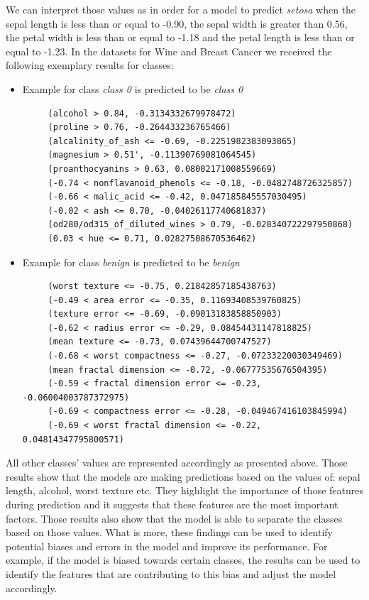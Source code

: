 \documentclass[journal, a4paper]{IEEEtran}
\begin{document}
We can interpret those values as in order for a model to predict \textit{setosa} when the sepal length is less than or equal to -0.90, the sepal width is greater than 0.56, the petal width is less than or equal to -1.18  and the petal length is less than or equal to -1.23.
In the datasets for Wine and Breast Cancer we received the following exemplary results for classes:

\begin{itemize}
    \item Example for class \textit{class 0} is predicted to be \textit{class 0} \\
    {\tiny
    \begin{verbatim}
     (alcohol > 0.84, -0.3134332679978472)
     (proline > 0.76, -0.264433236765466)
     (alcalinity_of_ash <= -0.69, -0.2251982383093865)
     (magnesium > 0.51', -0.11390769081064545)
     (proanthocyanins > 0.63, 0.08002171008559669)
     (-0.74 < nonflavanoid_phenols <= -0.18, -0.0482748726325857)
     (-0.66 < malic_acid <= -0.42, 0.047185845557030495)
     (-0.02 < ash <= 0.70, -0.04026117740681837)
     (od280/od315_of_diluted_wines > 0.79, -0.028340722297950868)
     (0.03 < hue <= 0.71, 0.02827508670536462)
    \end{verbatim}
    }
\end{itemize}

\begin{itemize}
    \item Example for class \textit{benign} is predicted to be \textit{benign} \\
    {\tiny
    \begin{verbatim}
     (worst texture <= -0.75, 0.21842857185438763)
     (-0.49 < area error <= -0.35, 0.11693408539760825)
     (texture error <= -0.69, -0.09013183858850903)
     (-0.62 < radius error <= -0.29, 0.08454431147818825)
     (mean texture <= -0.73, 0.07439644700747527)
     (-0.68 < worst compactness <= -0.27, -0.07233220030349469)
     (mean fractal dimension <= -0.72, -0.06777535676504395)
     (-0.59 < fractal dimension error <= -0.23, -0.06004003787372975)
     (-0.69 < compactness error <= -0.28, -0.049467416103845994)
     (-0.69 < worst fractal dimension <= -0.22, 0.04814347795800571)
    \end{verbatim}
    }
\end{itemize}

All other classes' values are represented accordingly as presented above.
Those results show that the models are making predictions based on the values of: sepal length, alcohol, worst texture etc.
They highlight the importance of those features during prediction and it suggests that these features are the most important factors.
Those results also show that the model is able to separate the classes based on those values.
What is more, these findings can be used to identify potential biases and errors in the model and improve its performance.
For example, if the model is biased towards certain classes, the results can be used to identify the features that are contributing to this bias and adjust the model accordingly.
\end{document}
